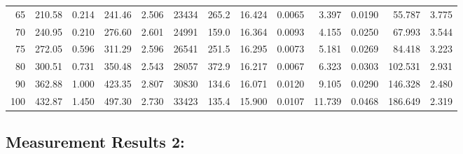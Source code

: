 \documentclass[10pt]{article}
\begin{document}
{\begin{tabular}{|r|rr|rr|rr|rr|rr|r|r|}
       65 &       210.58 &        0.214 &       241.46 &        2.506 &        23434 &        265.2 &       16.424 &       0.0065 &        3.397 &       0.0190 &       55.787 &        3.775 \\
       70 &       240.95 &        0.210 &       276.60 &        2.601 &        24991 &        159.0 &       16.364 &       0.0093 &        4.155 &       0.0250 &       67.993 &        3.544 \\
       75 &       272.05 &        0.596 &       311.29 &        2.596 &        26541 &        251.5 &       16.295 &       0.0073 &        5.181 &       0.0269 &       84.418 &        3.223 \\
       80 &       300.51 &        0.731 &       350.48 &        2.543 &        28057 &        372.9 &       16.217 &       0.0067 &        6.323 &       0.0303 &      102.531 &        2.931 \\
       90 &       362.88 &        1.000 &       423.35 &        2.807 &        30830 &        134.6 &       16.071 &       0.0120 &        9.105 &       0.0290 &      146.328 &        2.480 \\
      100 &       432.87 &        1.450 &       497.30 &        2.730 &        33423 &        135.4 &       15.900 &       0.0107 &       11.739 &       0.0468 &      186.649 &        2.319 \\
\hline
\end{tabular}
}



\subsection*{\large \bf Measurement Results 2:}
\end{document}
